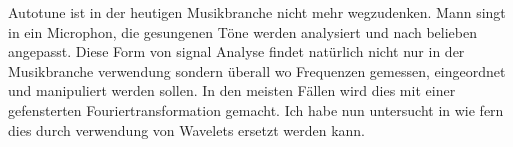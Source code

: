 Autotune ist in der heutigen Musikbranche nicht mehr wegzudenken. Mann singt in ein Microphon, die gesungenen Töne werden analysiert und nach belieben angepasst. Diese Form von signal Analyse findet natürlich nicht nur in der Musikbranche verwendung sondern überall wo Frequenzen gemessen, eingeordnet und manipuliert werden sollen. In den meisten Fällen wird dies mit einer gefensterten Fouriertransformation gemacht. Ich habe nun untersucht in wie fern dies durch verwendung von Wavelets ersetzt werden kann.\\